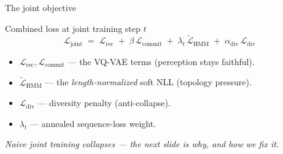\documentclass[aspectratio=169,10pt]{beamer}
\newcommand{\Lcal}{\mathcal{L}}
\begin{document}
\begin{frame}{The joint objective}
  \begin{block}{Combined loss at joint training step $t$}
    \[
      \Lcal_{\text{joint}} \;=\;
      \Lcal_{\text{rec}}
      \;+\; \beta\,\Lcal_{\text{commit}}
      \;+\; \lambda_t\, \widetilde{\Lcal}_{\text{HMM}}
      \;+\; \alpha_{\text{div}}\,\Lcal_{\text{div}}
    \]
  \end{block}

  \vspace{0.3em}
  \begin{itemize}\setlength\itemsep{0.35em}
    \item $\Lcal_{\text{rec}}, \Lcal_{\text{commit}}$ --- the VQ-VAE terms (perception stays faithful).
    \item $\widetilde{\Lcal}_{\text{HMM}}$ --- the \emph{length-normalized} soft NLL (topology pressure).
    \item $\Lcal_{\text{div}}$ --- diversity penalty (anti-collapse).
    \item $\lambda_t$ --- annealed sequence-loss weight.
  \end{itemize}

  \vspace{0.4em}
  \begin{center}\color{deepblue}\itshape
    Naive joint training collapses --- the next slide is why, and how we fix it.
  \end{center}
\end{frame}
\end{document}

